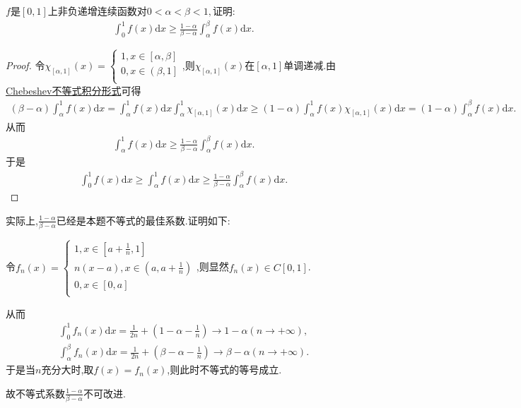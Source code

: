 \documentclass[lang=cn,newtx,10pt,scheme=chinese]{../Template/elegantbook}
\begin{document}
\begin{example}
$f$是$[0,1]$上非负递增连续函数对$0 < \alpha < \beta < 1,$证明:
\begin{gather}
\int_{0}^{1} f(x) \mathrm{d}x \geq \frac{1 - \alpha}{\beta - \alpha} \int_{\alpha}^{\beta} f(x) \mathrm{d}x.
\nonumber
\end{gather}
\end{example}
\begin{proof}
令$\chi _{\left[ \alpha ,1 \right]}\left( x \right) =\begin{cases}
1,x\in \left[ \alpha ,\beta \right]\\
0,x\in \left( \beta ,1 \right]\\
\end{cases}$,则$\chi _{\left[ \alpha ,1 \right]}\left( x \right)$在$[\alpha,1]$单调递减.由\hyperref[Basis of Analytics-Chebeshev不等式积分形式]{Chebeshev不等式积分形式}可得
\begin{align*}
\left( \beta -\alpha \right) \int_{\alpha}^1{f(x)\mathrm{d}x}=\int_{\alpha}^1{f(x)\mathrm{d}x\int_{\alpha}^1{\chi _{\left[ \alpha ,1 \right]}\left( x \right) \mathrm{d}x}}\geqslant \left( 1-\alpha \right) \int_{\alpha}^1{f\left( x \right) \chi _{\left[ \alpha ,1 \right]}\left( x \right) \mathrm{d}x}=\left( 1-\alpha \right) \int_{\alpha}^{\beta}{f\left( x \right) \mathrm{d}x}.
\nonumber
\end{align*}
从而
\begin{align*}
\int_{\alpha}^1{f(x)\mathrm{d}x}\geqslant \frac{1-\alpha}{\beta -\alpha}\int_{\alpha}^{\beta}{f\left( x \right) \mathrm{d}x}.
\nonumber
\end{align*}
于是
\begin{align*}
\int_0^1{f(x)\mathrm{d}x}\geqslant \int_{\alpha}^1{f(x)\mathrm{d}x}\geqslant \frac{1-\alpha}{\beta -\alpha}\int_{\alpha}^{\beta}{f\left( x \right) \mathrm{d}x}.
\nonumber
\end{align*}
\end{proof}
\begin{remark}
实际上,$\frac{1-\alpha}{\beta -\alpha}$已经是本题不等式的最佳系数.证明如下:

令$f_n\left( x \right) =\begin{cases}
1,x\in \left[ a+\frac{1}{n},1 \right]\\
n\left( x-a \right) ,x\in \left( a,a+\frac{1}{n} \right)\\
0,x\in \left[ 0,a \right]\\
\end{cases}$,则显然$f_n(x)\in C[0,1]$.

从而
\begin{align*}
\int_0^1{f_n\left( x \right) \mathrm{d}x}=\frac{1}{2n}+\left( 1-\alpha -\frac{1}{n} \right) \rightarrow 1-\alpha \left( n\rightarrow +\infty \right) ,
\\
\int_{\alpha}^{\beta}{f_n\left( x \right) \mathrm{d}x}=\frac{1}{2n}+\left( \beta -\alpha -\frac{1}{n} \right) \rightarrow \beta -\alpha \left( n\rightarrow +\infty \right) .
\nonumber
\end{align*}
于是当$n$充分大时,取$f(x)=f_n(x)$,则此时不等式的等号成立.

故不等式系数$\frac{1-\alpha}{\beta -\alpha}$不可改进.
\end{remark}
\end{document}
